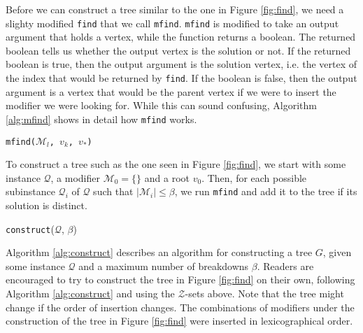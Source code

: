Before we can construct a tree similar to the one in Figure \ref{fig:find},
we need a slighty modified \texttt{find} that we call \texttt{mfind}.
\texttt{mfind} is modified to take an output argument that holds a vertex,
while the function returns a boolean.
The returned boolean tells us whether the output vertex is the solution or not.
If the returned boolean is true, then the output argument is the solution
vertex, i.e. the vertex of the index that would be returned by \texttt{find}.
If the boolean is false, then the output argument is a vertex that would be the
parent vertex if we were to insert the modifier we were looking for.
While this can sound confusing, Algorithm \ref{alg:mfind} shows in detail how
\texttt{mfind} works.

\begin{algorithm}[ht!]
\caption{\texttt{mfind($\mathcal{M}_l$, $v_k$, $v_*$)}}
\label{alg:mfind}

\end{algorithm}
To construct a tree such as the one seen in Figure \ref{fig:find}, we start
with some instance $\mathcal{Q}$, a modifier $\mathcal{M}_0 = \{ {} \}$ and
a root $v_0$.
Then, for each possible subinstance $\mathcal{Q}_i$ of $\mathcal{Q}$ such that
$|\mathcal{M}_i| \leq \beta$, we run \texttt{mfind} and add it to the tree if its
solution is distinct.

\begin{algorithm}[ht!]
\caption{\texttt{construct}($\mathcal{Q}$, $\beta$)}
\label{alg:construct}

\end{algorithm}
Algorithm \ref{alg:construct} describes an algorithm for constructing a tree
$G$, given some instance $\mathcal{Q}$ and a maximum number of breakdowns
$\beta$.
Readers are encouraged to try to construct the tree in Figure \ref{fig:find} on
their own, following Algorithm \ref{alg:construct} and using the
$\mathcal{Z}$-sets above. Note that the tree might change if the order of
insertion changes. The combinations of modifiers under the construction of the
tree in Figure \ref{fig:find} were inserted in lexicographical order.

